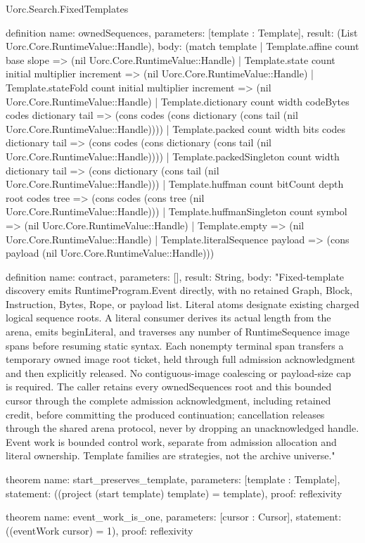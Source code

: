 \begin{lexlean}{Uorc.Search.FixedTemplates}
\begin{semanticmodule}
definition{
  name: ownedSequences,
  parameters: [template : Template],
  result: (List Uorc.Core.RuntimeValue::Handle),
  body: (match template
    | Template.affine count base slope => (nil Uorc.Core.RuntimeValue::Handle)
    | Template.state count initial multiplier increment => (nil Uorc.Core.RuntimeValue::Handle)
    | Template.stateFold count initial multiplier increment => (nil Uorc.Core.RuntimeValue::Handle)
    | Template.dictionary count width codeBytes codes dictionary tail => (cons codes (cons dictionary (cons tail (nil Uorc.Core.RuntimeValue::Handle))))
    | Template.packed count width bits codes dictionary tail => (cons codes (cons dictionary (cons tail (nil Uorc.Core.RuntimeValue::Handle))))
    | Template.packedSingleton count width dictionary tail => (cons dictionary (cons tail (nil Uorc.Core.RuntimeValue::Handle)))
    | Template.huffman count bitCount depth root codes tree => (cons codes (cons tree (nil Uorc.Core.RuntimeValue::Handle)))
    | Template.huffmanSingleton count symbol => (nil Uorc.Core.RuntimeValue::Handle)
    | Template.empty => (nil Uorc.Core.RuntimeValue::Handle)
    | Template.literalSequence payload => (cons payload (nil Uorc.Core.RuntimeValue::Handle)))
}

definition{
  name: contract,
  parameters: [],
  result: String,
  body: "Fixed-template discovery emits RuntimeProgram.Event directly, with no retained Graph, Block, Instruction, Bytes, Rope, or payload list. Literal atoms designate existing charged logical sequence roots. A literal consumer derives its actual length from the arena, emits beginLiteral, and traverses any number of RuntimeSequence image spans before resuming static syntax. Each nonempty terminal span transfers a temporary owned image root ticket, held through full admission acknowledgment and then explicitly released. No contiguous-image coalescing or payload-size cap is required. The caller retains every ownedSequences root and this bounded cursor through the complete admission acknowledgment, including retained credit, before committing the produced continuation; cancellation releases through the shared arena protocol, never by dropping an unacknowledged handle. Event work is bounded control work, separate from admission allocation and literal ownership. Template families are strategies, not the archive universe."
}

theorem{
  name: start_preserves_template,
  parameters: [template : Template],
  statement: ((project (start template) template) = template),
  proof: reflexivity{}
}

theorem{
  name: event_work_is_one,
  parameters: [cursor : Cursor],
  statement: ((eventWork cursor) = 1),
  proof: reflexivity{}
}
\end{semanticmodule}
\end{lexlean}
